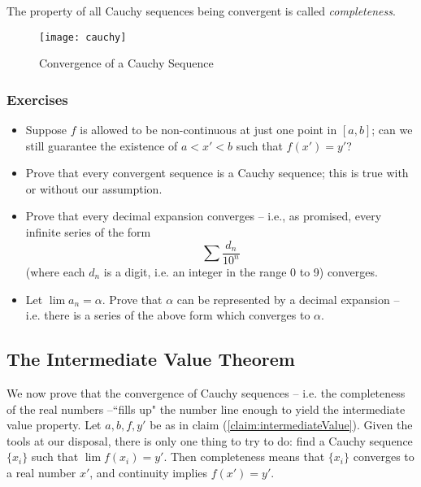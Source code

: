 The property of all Cauchy sequences being convergent is called \emph{completeness}.

\begin{figure}
\begin{center}
\texttt{[image: cauchy]}
\end{center}
\caption{Convergence of a Cauchy Sequence \label{fig:cauchy}}
\end{figure}

\subsubsection{Exercises}
\begin{itemize}
\item Suppose $f$ is allowed to be non-continuous at just one point in $[a,b]$; can we still guarantee the existence of $a < x' < b$ such that $f(x') = y'$?
\item Prove that every convergent sequence is a Cauchy sequence; this is true with or without our assumption.
\item Prove that every decimal expansion converges -- i.e., as promised, every infinite series of the form
\begin{equation}\label{eq:decimalExpansionExercise}
\sum \frac{d_n}{10^n}
\end{equation}
 (where each $d_n$ is a digit, i.e. an integer in the range 0 to 9) converges.
\item Let $\lim a_n = \alpha$. Prove that $\alpha$ can be represented by a decimal expansion -- i.e. there is a series of the above form which converges to $\alpha$.
\end{itemize}


\subsection{The Intermediate Value Theorem}
We now prove that the convergence of Cauchy sequences -- i.e. the completeness of the real numbers --``fills up" the number line enough to yield the intermediate value property. Let $a,b,f,y'$ be as in claim (\ref{claim:intermediateValue}). Given the tools at our disposal, there is only one thing to try to do: find a Cauchy sequence $\{x_i\}$ such that $\lim f(x_i) = y'$. Then completeness means that $\{x_i\}$ converges to a real number $x'$, and continuity implies $f(x')=y'$.

